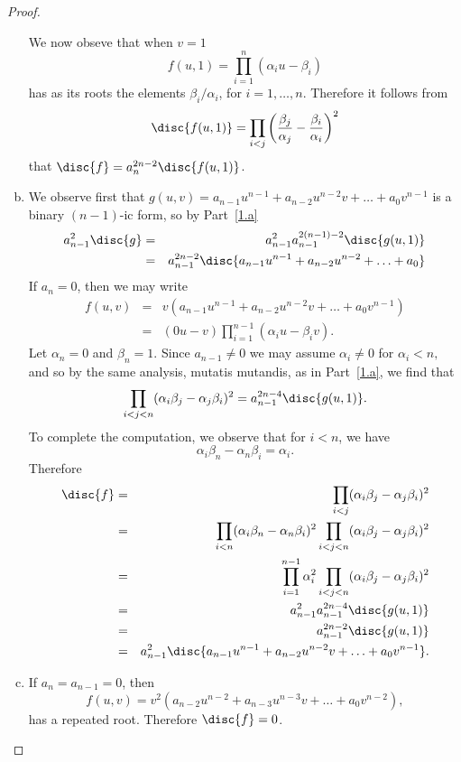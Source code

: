 \documentclass[10pt]{amsart}
\begin{document}
\begin{thm}[10 points]
\begin{proof}
\begin{enumerate}[(a)]
      We now obseve that when $v = 1$
      $$f(u,1) = \prod_{i = 1}^n \left(\alpha_iu - \beta_i\right)$$
      has as its roots the elements $\beta_i/\alpha_i$, for $i = 1, \ldots, n$.
      Therefore it follows from 
      $$\disc{f(u,1)} = \prod_{i < j} \left(\frac{\beta_j}{\alpha_j} - \frac{\beta_i}{\alpha_i}\right)^2$$
      that $\disc{f} = a_n^{2n - 2}\disc{f(u,1)}$.
    \item
      We observe first that $g(u,v) = a_{n-1}u^{n-1} + a_{n-2}u^{n-2}v + \ldots + a_0v^{n-1}$ is a binary $(n-1)$-ic form, so by Part~\ref{1.a}
      \begin{eqnarray*}
        a_{n-1}^2 \disc{g} &=& a_{n-1}^2 a_{n-1}^{2(n-1)-2} \disc{g(u,1)}\\
        &=& a_{n-1}^{2n-2} \disc{a_{n-1}u^{n-1} + a_{n-2}u^{n-2} + \ldots + a_0}
      \end{eqnarray*}
      If $a_n = 0$, then we may write
      \begin{eqnarray*}
        f(u,v) &=& v\left(a_{n-1}u^{n-1} + a_{n-2}u^{n-2}v + \ldots + a_0v^{n-1}\right)\\
        &=& (0u - v)\prod_{i = 1}^{n-1} (\alpha_i u - \beta_i v).
      \end{eqnarray*}
      Let $\alpha_n = 0$ and $\beta_n = 1$.
      Since $a_{n-1} \neq 0$ we may assume $\alpha_i \neq 0$ for $\alpha_i < n,$ and so by the same analysis, mutatis mutandis, as in Part~\ref{1.a}, we find that
      $$\prod_{i < j < n}(\alpha_i\beta_j - \alpha_j\beta_i)^2 = a_{n-1}^{2n - 4}\disc{g(u,1)}.$$
      To complete the computation, we observe that for $i < n$, we have
      $$\alpha_i\beta_n -\alpha_n\beta_i = \alpha_i.$$
      Therefore
      \begin{eqnarray*}
        \disc{f} &=& \prod_{i < j}(\alpha_i\beta_j - \alpha_j\beta_i)^2\\
        &=& \prod_{i < n} (\alpha_i\beta_n - \alpha_n\beta_i)^2\prod_{i < j < n}(\alpha_i\beta_j - \alpha_j\beta_i)^2\\
        &=& \prod_{i = 1}^{n-1} \alpha_i^2\prod_{i < j < n}(\alpha_i\beta_j - \alpha_j\beta_i)^2\\
        &=& a_{n-1}^2 a_{n-1}^{2n - 4}\disc{g(u,1)}\\
        &=& a_{n-1}^{2n - 2}\disc{g(u,1)}\\
        &=& a_{n-1}^2 \disc{a_{n-1}u^{n-1} + a_{n-2}u^{n-2}v + \ldots + a_0v^{n-1}}.
      \end{eqnarray*}
    \item
      If $a_n = a_{n-1} = 0$, then 
      $$f(u,v) = v^2\left(a_{n-2}u^{n-2} + a_{n-3}u^{n-3}v + \ldots + a_0v^{n-2}\right),$$
      has a repeated root.
      Therefore $\disc{f} = 0$.
      
    \end{enumerate}
  \end{proof}
\end{thm}
\end{document}
